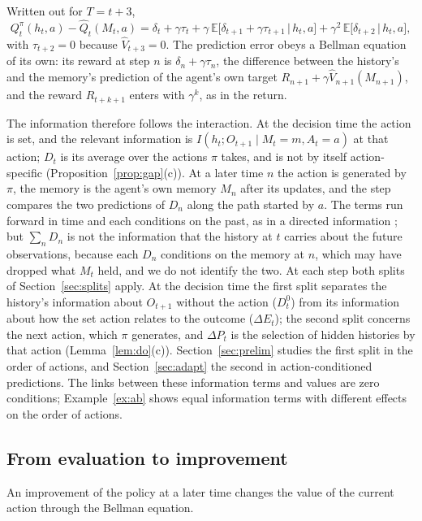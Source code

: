 \documentclass{article}
\theoremstyle{definition}
\theoremstyle{remark}
\newcommand{\E}{\mathbb{E}}
\newcommand{\dE}{\Delta E}
\newcommand{\dP}{\Delta P}
\begin{document}
Written out for $T=t+3$,
\[
Q^\pi_t(h_t,a)-\hat Q_t(M_t,a)=\delta_t+\gamma\tau_t+\gamma\,\E\big[\delta_{t+1}+\gamma\tau_{t+1}\,\big|\,h_t,a\big]+\gamma^2\,\E\big[\delta_{t+2}\,\big|\,h_t,a\big],
\]
with $\tau_{t+2}=0$ because $\hat V_{t+3}=0$. The prediction error obeys a Bellman equation of its own: its reward at step $n$ is $\delta_n+\gamma\tau_n$, the difference between the history's and the memory's prediction of the agent's own target $R_{n+1}+\gamma\hat V_{n+1}(M_{n+1})$, and the reward $R_{t+k+1}$ enters with $\gamma^k$, as in the return.

The information therefore follows the interaction. At the decision time the action is set, and the relevant information is $I(h_t;O_{t+1}\mid M_t=m,A_t=a)$ at that action; $D_t$ is its average over the actions $\pi$ takes, and is not by itself action-specific (Proposition~\ref{prop:gap}(c)). At a later time $n$ the action is generated by $\pi$, the memory is the agent's own memory $M_n$ after its updates, and the step compares the two predictions of $D_n$ along the path started by $a$. The terms run forward in time and each conditions on the past, as in a directed information \citep{abel2025plasticity}; but $\sum_nD_n$ is not the information that the history at $t$ carries about the future observations, because each $D_n$ conditions on the memory at $n$, which may have dropped what $M_t$ held, and we do not identify the two. At each step both splits of Section~\ref{sec:splits} apply. At the decision time the first split separates the history's information about $O_{t+1}$ without the action ($D^0_t$) from its information about how the set action relates to the outcome ($\dE_t$); the second split concerns the next action, which $\pi$ generates, and $\dP_t$ is the selection of hidden histories by that action (Lemma~\ref{lem:do}(c)). Section~\ref{sec:prelim} studies the first split in the order of actions, and Section~\ref{sec:adapt} the second in action-conditioned predictions. The links between these information terms and values are zero conditions; Example~\ref{ex:ab} shows equal information terms with different effects on the order of actions.

\subsection{From evaluation to improvement}

An improvement of the policy at a later time changes the value of the current action through the Bellman equation.
\end{document}
